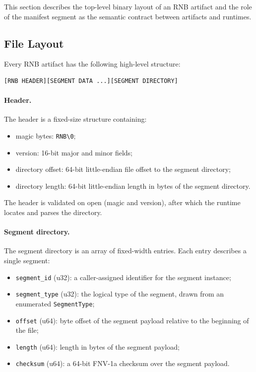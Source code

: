 \documentclass[11pt]{article}
\begin{document}
This section describes the top-level binary layout of an RNB artifact
and the role of the manifest segment as the semantic contract between
artifacts and runtimes.

\subsection{File Layout}

Every RNB artifact has the following high-level structure:
\begin{verbatim}
[RNB HEADER][SEGMENT DATA ...][SEGMENT DIRECTORY]
\end{verbatim}

\paragraph{Header.}
The header is a fixed-size structure containing:
\begin{itemize}
  \item magic bytes: \verb|RNB\0|;
  \item version: 16-bit major and minor fields;
  \item directory offset: 64-bit little-endian file offset to the
        segment directory;
  \item directory length: 64-bit little-endian length in bytes of the
        segment directory.
\end{itemize}

The header is validated on open (magic and version), after which the
runtime locates and parses the directory.

\paragraph{Segment directory.}
The segment directory is an array of fixed-width entries. Each entry
describes a single segment:
\begin{itemize}
  \item \verb|segment_id| (u32): a caller-assigned identifier for the
        segment instance;
  \item \verb|segment_type| (u32): the logical type of the segment,
        drawn from an enumerated \texttt{SegmentType};
  \item \verb|offset| (u64): byte offset of the segment payload
        relative to the beginning of the file;
  \item \verb|length| (u64): length in bytes of the segment payload;
  \item \verb|checksum| (u64): a 64-bit FNV-1a checksum over the
        segment payload.
\end{itemize}
\end{document}
